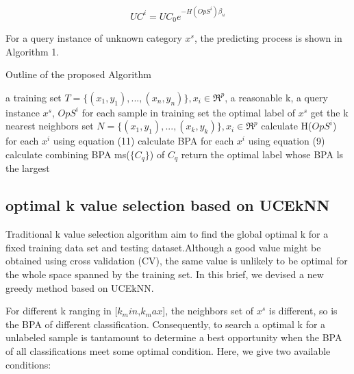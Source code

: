 \documentclass[runningheads]{llncs}
\begin{document}
\begin{equation}
UC^i=UC_0e^{-H(OpS^i)\beta_u}
\end{equation}

For a query instance of unknown category $x^s$, the predicting process is shown in Algorithm 1.


\begin{algorithm} %
\caption{Outline of the proposed Algorithm} %
\label{alg1} %
\begin{algorithmic}[1] %
\REQUIRE  a training set $T=\{(x_1,y_1),...,(x_n,y_n)\}, x_i \in \Re ^p$,  a reasonable k, a query instance $x^s$, $OpS^i$ for each sample in training set %
\ENSURE the optimal label of $x^s$ %
\STATE get the k  nearest neighbors set $N=\{(x_1,y_1),...,(x_k,y_k)\}, x_i \in \Re ^p$
\STATE calculate H($OpS^i$) for each $x^i$ using equation (11)
\STATE  calculate BPA for each $x^i$ using equation (9)
\ENDFOR
{}
\STATE  calculate combining BPA ms($\{C_q\}$) of $C_q$
\ENDFOR
\STATE return the optimal label whose BPA ls the largest

\end{algorithmic}
\end{algorithm}











\subsection{optimal k value selection based on UCEkNN}

Traditional k value selection algorithm aim to find the global optimal k for a fixed training data set and testing dataset.Although a good value might be obtained using cross validation (CV), the same value is unlikely to be optimal for the whole space spanned by the training set. In this brief, we devised a new greedy method based on UCEkNN.

For different k ranging in [$k_min$,$k_max$], the neighbors set of $x^s$ is different, so is the BPA of different classification. Consequently, to search a optimal k for a unlabeled sample is tantamount to determine a best opportunity when the BPA of all classifications meet some optimal condition. Here, we give two available conditions: 
\end{document}
